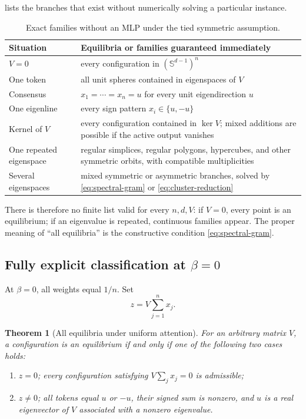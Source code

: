 \documentclass[11pt,a4paper]{article}
\newtheorem{theorem}{Theorem}[section]
\theoremstyle{definition}
\newcommand{\sphere}{\mathbb S}
\begin{document}
 lists the branches that exist without numerically solving a
particular instance.

\begin{table}[ht]
\centering
\caption{Exact families without an MLP under the tied symmetric assumption.}
\label{tab:families}
\begin{tabularx}{\textwidth}{@{}lX@{}}
\toprule
Situation & Equilibria or families guaranteed immediately \\
\midrule
$V=0$ & every configuration in $(\sphere^{d-1})^n$ \\
One token & all unit spheres contained in eigenspaces of $V$ \\
Consensus & $x_1=\cdots=x_n=u$ for every unit eigendirection $u$ \\
One eigenline & every sign pattern $x_i\in\{u,-u\}$ \\
Kernel of $V$ & every configuration contained in $\ker V$; mixed additions are possible if the active output vanishes \\
One repeated eigenspace & regular simplices, regular polygons, hypercubes, and other symmetric orbits, with compatible multiplicities \\
Several eigenspaces & mixed symmetric or asymmetric branches, solved by \eqref{eq:spectral-gram} or \eqref{eq:cluster-reduction} \\
\bottomrule
\end{tabularx}
\end{table}

There is therefore no finite list valid for every $n,d,V$: if $V=0$, every point is
an equilibrium; if an eigenvalue is repeated, continuous families appear. The proper
meaning of ``all equilibria'' is the constructive condition \eqref{eq:spectral-gram}.

\subsection{Fully explicit classification at \texorpdfstring{$\beta=0$}{beta = 0}}

At $\beta=0$, all weights equal $1/n$. Set
\[
 z=V\sum_{j=1}^n x_j.
\]

\begin{theorem}[All equilibria under uniform attention]
\label{thm:beta-zero}
For an arbitrary matrix $V$, a configuration is an equilibrium if and only if one of
the following two cases holds:
\begin{enumerate}
  \item $z=0$; every configuration satisfying $V\sum_jx_j=0$ is admissible;
  \item $z\neq0$; all tokens equal $u$ or $-u$, their signed sum is nonzero, and $u$
  is a real eigenvector of $V$ associated with a nonzero eigenvalue.
\end{enumerate}
\end{theorem}
\end{document}
